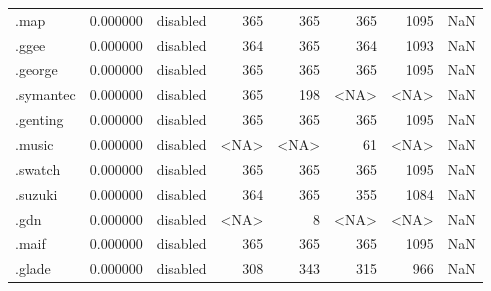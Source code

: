 \begin{tabular}{lrlrrrrl}
.map                      &          0.000000 &        disabled &                         365 &                         365 &                         365 &                1095 &                  NaN \\
.ggee                     &          0.000000 &        disabled &                         364 &                         365 &                         364 &                1093 &                  NaN \\
.george                   &          0.000000 &        disabled &                         365 &                         365 &                         365 &                1095 &                  NaN \\
.symantec                 &          0.000000 &        disabled &                         365 &                         198 &                        <NA> &                <NA> &                  NaN \\
.genting                  &          0.000000 &        disabled &                         365 &                         365 &                         365 &                1095 &                  NaN \\
.music                    &          0.000000 &        disabled &                        <NA> &                        <NA> &                          61 &                <NA> &                  NaN \\
.swatch                   &          0.000000 &        disabled &                         365 &                         365 &                         365 &                1095 &                  NaN \\
.suzuki                   &          0.000000 &        disabled &                         364 &                         365 &                         355 &                1084 &                  NaN \\
.gdn                      &          0.000000 &        disabled &                        <NA> &                           8 &                        <NA> &                <NA> &                  NaN \\
.maif                     &          0.000000 &        disabled &                         365 &                         365 &                         365 &                1095 &                  NaN \\
.glade                    &          0.000000 &        disabled &                         308 &                         343 &                         315 &                 966 &                  NaN \\

\end{tabular}
